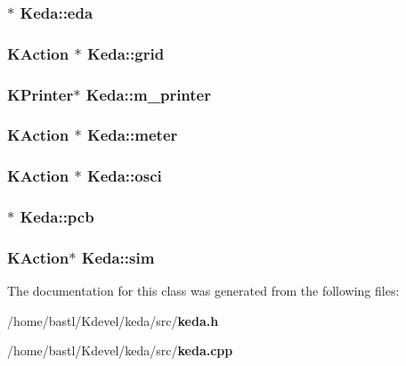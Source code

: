 \subsubsection{$\ast$ {\bf Keda::eda}}\label{classKeda_c1cf01e97872427ced3cc4d2b5410705}


\subsubsection{\setlength{\rightskip}{0pt plus 5cm}KAction $\ast$ {\bf Keda::grid}}\label{classKeda_ff4a008470319a22d9cf3d14af485977}


\subsubsection{\setlength{\rightskip}{0pt plus 5cm}KPrinter$\ast$ {\bf Keda::m\_\-printer}\hspace{0.3cm}{\tt  [private]}}\label{classKeda_8e823f6da24fcb64ec267d4c03581b26}


\subsubsection{\setlength{\rightskip}{0pt plus 5cm}KAction $\ast$ {\bf Keda::meter}}\label{classKeda_558ddfdd3620c111fe112b4671b77c6d}


\subsubsection{\setlength{\rightskip}{0pt plus 5cm}KAction $\ast$ {\bf Keda::osci}}\label{classKeda_ed0dd5f2fba480b6ede27b82bb692337}


\subsubsection{$\ast$ {\bf Keda::pcb}}\label{classKeda_f42a83f45934ad4e2e2628bec3dfede9}


\subsubsection{\setlength{\rightskip}{0pt plus 5cm}KAction$\ast$ {\bf Keda::sim}}\label{classKeda_e9064b74d28acc053231170bb8c858b3}




The documentation for this class was generated from the following files:\begin{CompactItemize}
\item 
/home/bastl/Kdevel/keda/src/{\bf keda.h}\item 
/home/bastl/Kdevel/keda/src/{\bf keda.cpp}\end{CompactItemize}
